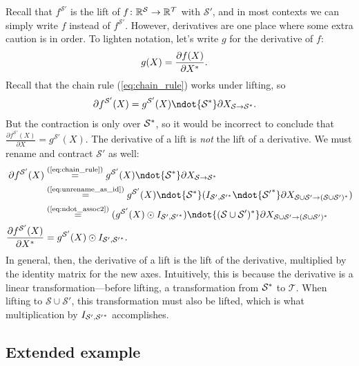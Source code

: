 Recall that $f^\mathcal{S'}$ is the lift of $f \colon \mathbb{R}^\mathcal{S} \rightarrow \mathbb{R}^\mathcal{T}$ with $\mathcal{S'}$, and in most contexts we can simply write $f$ instead of $f^\mathcal{S'}$. However, derivatives are one place where some extra caution is in order.
To lighten notation, let's write $g$ for the derivative of $f$:
\begin{align*}
  g(X) &= \frac{\partial f(X)}{\partial X^*}.
\end{align*}
Recall that the chain rule (\ref{eq:chain_rule}) works under lifting, so
\begin{align*}
  \partial f^{\mathcal{S'}} (X) &= g^{\mathcal{S'}}(X) \ndot{\mathcal{S}\inax} \partial X_{\mathcal{S}\rightarrow\mathcal{S}\inax}.
\end{align*}
But the contraction is only over $\mathcal{S}^*$, so it would be incorrect to conclude that $\frac{\partial f^{\mathcal{S'}}(X)}{\partial X} = g^{\mathcal{S'}}(X)$. The derivative of a lift is \emph{not} the lift of a derivative. We must rename and contract $\mathcal{S'}$ as well:
\begin{align*}
  \partial f^{\mathcal{S'}} (X)
  &\eqby{eq:chain_rule} g^{\mathcal{S'}}(X) \ndot{\mathcal{S}\inax} \partial X_{\mathcal{S}\rightarrow\mathcal{S}\inax} \\
  &\eqby{eq:unrename_as_id} g^{\mathcal{S'}}(X) \ndot{\mathcal{S}\inax} (I_{\mathcal{S'},\mathcal{S'}\inax} \ndot{\mathcal{S'}\inax} \partial X_{\mathcal{S}\cup\mathcal{S'}\rightarrow(\mathcal{S}\cup\mathcal{S'})\inax}) \\
  &\eqby{eq:ndot_assoc2} (g^{\mathcal{S'}}(X) \odot I_{\mathcal{S'},\mathcal{S'}\inax}) \ndot{(\mathcal{S}\cup\mathcal{S'})\inax} \partial X_{\mathcal{S}\cup\mathcal{S'}\rightarrow(\mathcal{S}\cup\mathcal{S'})\inax} \\
  \frac{\partial f^{\mathcal{S'}} (X)}{\partial X\inax}
  &= g^{\mathcal{S'}}(X) \odot I_{\mathcal{S'}, \mathcal{S'}\inax}.
\end{align*}
In general, then, the derivative of a lift is the lift of the derivative, multiplied by the identity matrix for the new axes.
Intuitively, this is because the derivative is a linear transformation---before lifting, a transformation from $\mathcal{S}^*$ to $\mathcal{T}$. When lifting to $\mathcal{S} \cup \mathcal{S}'$, this transformation must also be lifted, which is what multiplication by $I_{\mathcal{S}',\mathcal{S'}^*}$ accomplishes.

\subsection{Extended example}

